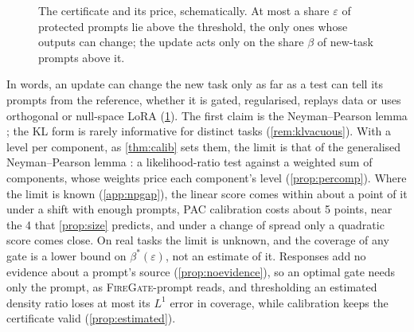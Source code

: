 \documentclass{article}
\theoremstyle{plain}
\theoremstyle{definition}
\theoremstyle{remark}
\newcommand{\methodp}{\textsc{FireGate}-prompt}
\begin{document}
\begin{figure}[t]
\centering
{}
\caption{The certificate and its price, schematically. At most a share $\varepsilon$ of protected prompts lie above the
threshold, the only ones whose outputs can change; the update acts only on the share $\beta$ of new-task prompts above
it.}
\label{fig:np}
\end{figure}

In words, an update can change the new task only as far as a test can tell its prompts from the reference, whether
it is gated, regularised, replays data or uses orthogonal or null-space LoRA (\cref{fig:np}). The first claim is the Neyman--Pearson lemma \citep{neyman1933}; the KL form is rarely informative
for distinct tasks (\cref{rem:klvacuous}). With a level per component, as \cref{thm:calib} sets them, the limit is that of the
generalised Neyman--Pearson lemma \citep{dantzig1951fundamental,lehmann2022testing}: a likelihood-ratio test against a
weighted sum of components, whose weights price each component's level (\cref{prop:percomp}). Where the limit is
known (\cref{app:npgap}), the linear score comes within about a point of it under a shift with enough prompts, PAC
calibration costs about 5 points, near the 4 that \cref{prop:size} predicts, and under a change of spread only a quadratic
score comes close. On real tasks the limit is unknown, and the coverage of any gate is a lower bound on
$\beta^\ast(\varepsilon)$, not an estimate of it. Responses add no evidence about a prompt's source
(\cref{prop:noevidence}), so an optimal gate needs only the prompt, as \methodp{} reads, and thresholding an estimated
density ratio loses at most its $L^1$ error in coverage, while calibration keeps the certificate valid
(\cref{prop:estimated}).
\end{document}
